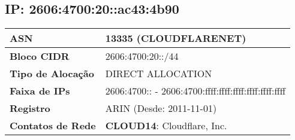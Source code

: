     \subsection{IP: 2606:4700:20::ac43:4b90}
    \begin{tabular}{|l|l|}
    \hline
    \textbf{ASN} & 13335 (CLOUDFLARENET) \\ \hline
    \textbf{Bloco CIDR} & 2606:4700:20::/44 \\ \hline
    \textbf{Tipo de Alocação} & DIRECT ALLOCATION \\ \hline
    \textbf{Faixa de IPs} & 2606:4700:: - 2606:4700:ffff:ffff:ffff:ffff:ffff:ffff \\ \hline
    \textbf{Registro} & ARIN (Desde: 2011-11-01) \\ \hline
        
\textbf{Contatos de Rede} & \textbf{CLOUD14}: Cloudflare, Inc. 
\\ \hline
\end{tabular}
